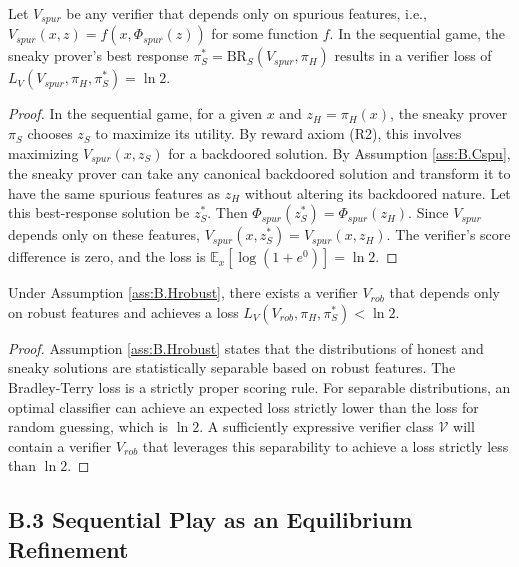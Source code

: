 \begin{lemma}\label{lem:B.spur_loss}
Let $V_{spur}$ be any verifier that depends only on spurious features, i.e., $V_{spur}(x, z) = f(x, \Phi_{spur}(z))$ for some function $f$. In the sequential game, the sneaky prover's best response $\pi_S^* = \mathrm{BR}_S(V_{spur}, \pi_H)$ results in a verifier loss of $L_V(V_{spur}, \pi_H, \pi_S^*) = \ln 2$.
\end{lemma}

\begin{proof}
In the sequential game, for a given $x$ and $z_H = \pi_H(x)$, the sneaky prover $\pi_S$ chooses $z_S$ to maximize its utility. By reward axiom (R2), this involves maximizing $V_{spur}(x, z_S)$ for a backdoored solution. By Assumption \ref{ass:B.Cspu}, the sneaky prover can take any canonical backdoored solution and transform it to have the same spurious features as $z_H$ without altering its backdoored nature. Let this best-response solution be $z_S^*$. Then $\Phi_{spur}(z_S^*) = \Phi_{spur}(z_H)$. Since $V_{spur}$ depends only on these features, $V_{spur}(x, z_S^*) = V_{spur}(x, z_H)$. The verifier's score difference is zero, and the loss is $\mathbb{E}_x[\log(1 + e^0)] = \ln 2$.
\end{proof}

\begin{lemma}\label{lem:B.rob_loss}
Under Assumption \ref{ass:B.Hrobust}, there exists a verifier $V_{rob}$ that depends only on robust features and achieves a loss $L_V(V_{rob}, \pi_H, \pi_S^*) < \ln 2$.
\end{lemma}

\begin{proof}
Assumption \ref{ass:B.Hrobust} states that the distributions of honest and sneaky solutions are statistically separable based on robust features. The Bradley-Terry loss is a strictly proper scoring rule. For separable distributions, an optimal classifier can achieve an expected loss strictly lower than the loss for random guessing, which is $\ln 2$. A sufficiently expressive verifier class $\mathcal{V}$ will contain a verifier $V_{rob}$ that leverages this separability to achieve a loss strictly less than $\ln 2$.
\end{proof}

\subsection*{B.3 Sequential Play as an Equilibrium Refinement}

